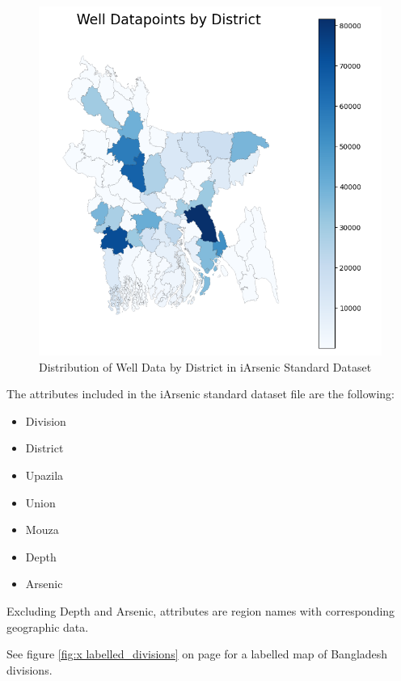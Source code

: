 \begin{figure}[!htb]
    \centering
    \includegraphics[scale=0.57]{figures/data_distribution_by_district.png} 
    \caption{Distribution of Well Data by District in iArsenic Standard Dataset}
    \label{fig:x avg_datapoints}
\end{figure}

\newpage

The attributes included in the iArsenic standard dataset file are the following:

\begin{itemize}
    \item Division
    \item District
    \item Upazila
    \item Union
    \item Mouza
    \item Depth
    \item Arsenic
\end{itemize}

Excluding Depth and Arsenic, attributes are region names with corresponding geographic data.

See figure \ref{fig:x labelled_divisions} on page \pageref{fig:x labelled_divisions} for a labelled map of Bangladesh divisions.

